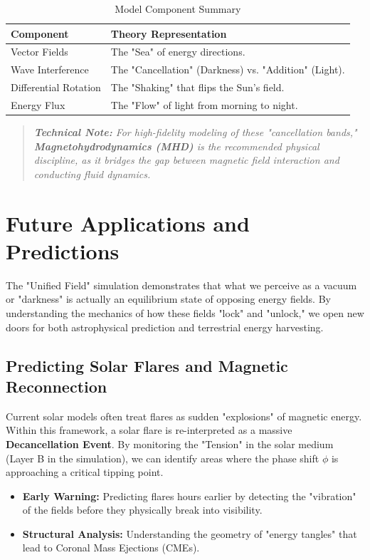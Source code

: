 \documentclass[11pt]{article}
\begin{document}
\vspace{1em}
\begin{table}[h]
\centering
\caption{Model Component Summary}
\begin{tabular}{|l|l|}
\hline
\textbf{Component} & \textbf{Theory Representation} \\ \hline
Vector Fields & The "Sea" of energy directions. \\ \hline
Wave Interference & The "Cancellation" (Darkness) vs. "Addition" (Light). \\ \hline
Differential Rotation & The "Shaking" that flips the Sun's field. \\ \hline
Energy Flux & The "Flow" of light from morning to night. \\ \hline
\end{tabular}
\end{table}

\begin{quote}
\textit{\textbf{Technical Note:} For high-fidelity modeling of these "cancellation bands," \textbf{Magnetohydrodynamics (MHD)} is the recommended physical discipline, as it bridges the gap between magnetic field interaction and conducting fluid dynamics.}
\end{quote}


\section*{Future Applications and Predictions}

The "Unified Field" simulation demonstrates that what we perceive as a vacuum or "darkness" is actually an equilibrium state of opposing energy fields. By understanding the mechanics of how these fields "lock" and "unlock," we open new doors for both astrophysical prediction and terrestrial energy harvesting.

\subsection*{Predicting Solar Flares and Magnetic Reconnection}
Current solar models often treat flares as sudden "explosions" of magnetic energy. Within this framework, a solar flare is re-interpreted as a massive \textbf{Decancellation Event}. By monitoring the "Tension" in the solar medium (Layer B in the simulation), we can identify areas where the phase shift $\phi$ is approaching a critical tipping point. 
\begin{itemize}
    \item \textbf{Early Warning:} Predicting flares hours earlier by detecting the "vibration" of the fields before they physically break into visibility.
    \item \textbf{Structural Analysis:} Understanding the geometry of "energy tangles" that lead to Coronal Mass Ejections (CMEs).
\end{itemize}
\end{document}
